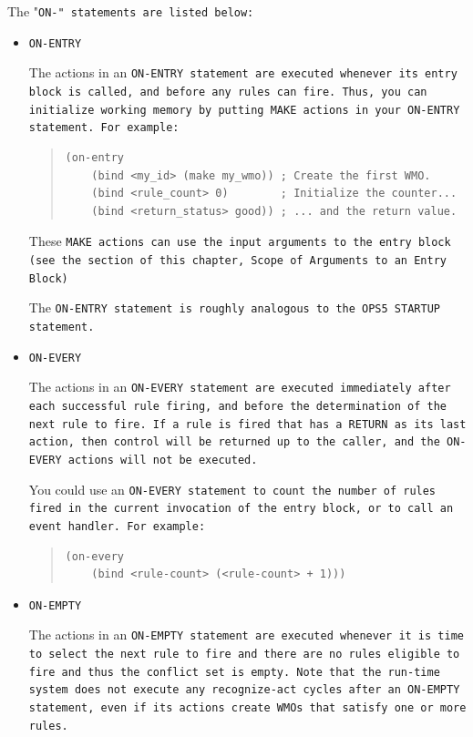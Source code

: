 The "\tt{ON-}" statements are listed below:
\begin{itemize}
  \item \tt{ON-ENTRY}

    The actions in an \tt{ON-ENTRY} statement are executed whenever
    its entry block is called, and before any rules can fire.  Thus,
    you can initialize working memory by putting \tt{MAKE} actions in
    your \tt{ON-ENTRY} statement. For example:

    \begin{quote}
\begin{verbatim}
(on-entry
    (bind <my_id> (make my_wmo)) ; Create the first WMO.
    (bind <rule_count> 0)        ; Initialize the counter...
    (bind <return_status> good)) ; ... and the return value.
\end{verbatim}
    \end{quote}

These \tt{MAKE} actions can use the input arguments to the entry block
(see the section of this chapter, Scope of Arguments to an Entry
Block)

The \tt{ON-ENTRY} statement is roughly analogous to the OPS5
\tt{STARTUP} statement.

\item \tt{ON-EVERY}

  The actions in an \tt{ON-EVERY} statement are executed immediately
  after each successful rule firing, and before the determination of
  the next rule to fire. If a rule is fired that has a \tt{RETURN} as
  its last action, then control will be returned up to the caller, and
  the \tt{ON-EVERY} actions will not be executed.

  You could use an \tt{ON-EVERY} statement to count the number of
  rules fired in the current invocation of the entry block, or to call
  an event handler. For example:
  \begin{quote}
\begin{verbatim}
(on-every
    (bind <rule-count> (<rule-count> + 1)))
\end{verbatim}
  \end{quote}
        
\item \tt{ON-EMPTY}

  The actions in an \tt{ON-EMPTY} statement are executed whenever it
  is time to select the next rule to fire and there are no rules
  eligible to fire and thus the conflict set is empty. Note that the
  run-time system does not execute any recognize-act cycles after an
  \tt{ON-EMPTY} statement, even if its actions create WMOs that
  satisfy one or more rules.


\end{itemize}
